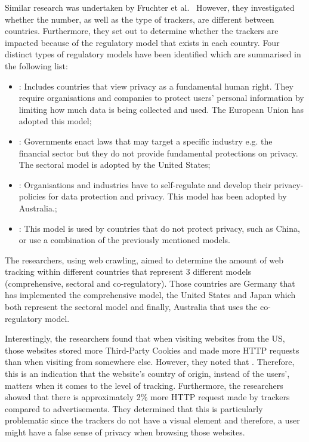 \documentclass[../main.tex]{subfiles}
\begin{document}
Similar research was undertaken by Fruchter et al.~\cite{fruchter2015variations} However, they investigated whether the number, as well as the type of trackers, are different between countries. Furthermore, they set out to determine whether the trackers are impacted because of the regulatory model that exists in each country. Four distinct types of regulatory models have been identified which are summarised in the following list:

\begin{itemize}
    \item {}: Includes countries that view privacy as a fundamental human right. They require organisations and companies to protect users’ personal information by limiting how much data is being collected and used. The European Union has adopted this model;
    \item {}: Governments enact laws that may target a specific industry e.g. the financial sector but they do not provide fundamental protections on privacy. The sectoral model is adopted by the United States;
    \item {}: Organisations and industries have to self-regulate and develop their privacy-policies for data protection and privacy. This model has been adopted by Australia.;
    \item {}: This model is used by countries that do not protect privacy, such as China, or use a combination of the previously mentioned models.
\end{itemize}

The researchers, using web crawling, aimed to determine the amount of web tracking within different countries that represent 3 different models (comprehensive, sectoral and co-regulatory). Those countries are Germany that has implemented the comprehensive model, the United States and Japan which both represent the sectoral model and finally, Australia that uses the co-regulatory model. 

Interestingly, the researchers found that when visiting websites from the US, those websites stored more Third-Party Cookies and made more HTTP requests than when visiting from somewhere else. However, they noted that . Therefore, this is an indication that the website’s country of origin, instead of the users’, matters when it comes to the level of tracking. Furthermore, the researchers showed that there is approximately 2\% more HTTP request made by trackers compared to advertisements. They determined that this is particularly problematic since the trackers do not have a visual element and therefore, a user might have a false sense of privacy when browsing those websites. 
\end{document}
